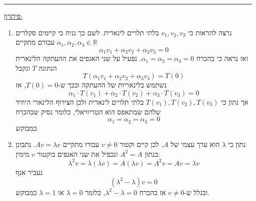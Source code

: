 \documentclass[12pt, a4paper]{article}
\newcommand{\rr}{\mathbb{R}}
\begin{document}
\begin{enumerate}
\pagebreak

    \forthQ
    \noindent\rule{\textwidth-30pt}{0.4pt}
\underline{פיתרון:}
\begin{enumerate}
    \item 
נרצה להראות כי
$v_1,v_2,v_3$
בלתי תלויים לינארית. לשם כך נניח כי קיימים סקלרים
$\alpha_1,\alpha_2,\alpha_3\in\rr$
עבורם מתקיים
$$\alpha_1 v_1+\alpha_2 v_2+\alpha_3 v_3=0$$
ואז נראה כי בהכרח
$\alpha_1=\alpha_2=\alpha_3=0$.
נפעיל על שני האגפים את ההעתקה הלינארית הנתונה
$T$
ונקבל
$$T(\alpha_1 v_1+\alpha_2 v_2+\alpha_3 v_3)=T(0)$$
נשתמש בלינאריות של ההעתקה ובכך ש-$T(0)=0$,
אז
$$\alpha_1 \cdot T(v_1)+\alpha_2\cdot T(v_2)+\alpha_3\cdot T(v_3)=0$$
אך נתון כי
$T(v_1),T(v_2),T(v_3)$
בלתי תלויים לינארית ולכן הצירוף הלינארי היחיד שלהם שמתאפס הוא הטריוויאלי, כלומר נסיק שבהכרח
$$\alpha_1=\alpha_2=\alpha_3=0$$
כמבוקש.

\item 
נתון כי
$\lambda$
הוא ערך עצמי של
$A$,
לכן
קיים וקטור
$v\neq 0$
עבורו מתקיים
$Av=\lambda v$.
נתבונן בנתון
$A^2=A$
ונכפיל את שני האגפים בוקטור 
$v$
מימין:
$$\lambda^2 v=\lambda(\lambda v)=A(\lambda v)=A^2v=Av=\lambda v$$
נעביר אגף
$$(\lambda^2-\lambda)v=0$$
ובגלל ש-$v\neq 0$
אז בהכרח
$\lambda^2-\lambda=0$,
כלומר
$\lambda=0$
או
$\lambda=1$
כמבוקש.
\end{enumerate}
 
\end{enumerate}
\end{document}
